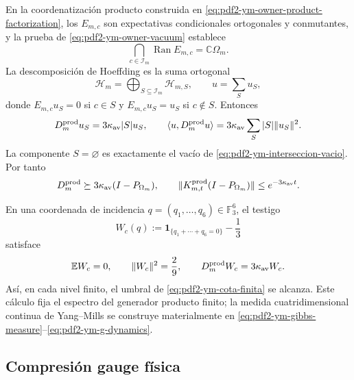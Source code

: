 En la coordenatización producto construida en
\eqref{eq:pdf2-ym-owner-product-factorization}, los $E_{m,c}$ son expectativas
condicionales ortogonales y conmutantes, y la prueba de
\eqref{eq:pdf2-ym-owner-vacuum} establece
\begin{equation}\label{eq:pdf2-ym-interseccion-vacio}
 \bigcap_{c\in\mathcal I_m}\operatorname{Ran}E_{m,c}
 =\mathbb C\Omega_m.
\end{equation}
La descomposición de Hoeffding es la suma ortogonal
\[
 \mathcal H_m=\bigoplus_{S\subseteq\mathcal I_m}\mathcal H_{m,S},
 \qquad u=\sum_Su_S,
\]
donde $E_{m,c}u_S=0$ si $c\in S$ y $E_{m,c}u_S=u_S$ si $c\notin S$.
Entonces
\begin{equation}\label{eq:pdf2-ym-hoeffding}
 D_m^{\rm prod}u_S=3\kappa_{\rm av}|S|u_S,
 \qquad
 \langle u,D_m^{\rm prod}u\rangle
 =3\kappa_{\rm av}\sum_S|S|\|u_S\|^2.
\end{equation}
La componente $S=\varnothing$ es exactamente el vacío de
\eqref{eq:pdf2-ym-interseccion-vacio}. Por tanto
\begin{equation}\label{eq:pdf2-ym-cota-finita}
 D_m^{\rm prod}\succeq
 3\kappa_{\rm av}(I-P_{\Omega_m}),
 \qquad
 \|K^{\rm prod}_{m,t}(I-P_{\Omega_m})\|
 \le e^{-3\kappa_{\rm av}t}.
\end{equation}

En una coordenada de incidencia
$q=(q_1,\ldots,q_6)\in\mathbb F_3^6$, el testigo
\begin{equation}\label{eq:pdf2-ym-wc}
 W_c(q):=\mathbf1_{\{q_1+\cdots+q_6=0\}}-\frac13
\end{equation}
satisface
\begin{equation}\label{eq:pdf2-ym-wc-momentos}
 \mathbb EW_c=0,\qquad \|W_c\|^2=\frac29,\qquad
 D_m^{\rm prod}W_c=3\kappa_{\rm av}W_c.
\end{equation}
Así, en cada nivel finito, el umbral de
\eqref{eq:pdf2-ym-cota-finita} se alcanza. Este cálculo fija el espectro del
generador producto finito; la medida cuatridimensional continua de Yang--Mills se
construye materialmente en
\eqref{eq:pdf2-ym-gibbs-measure}--\eqref{eq:pdf2-ym-g-dynamics}.

\subsection{Compresión gauge física}

